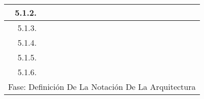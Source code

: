 \documentclass[12pt]{article}
\begin{document}
\begin{table}[H]
{\begin{tabular}{|rllllllllllllllll|}
        \multicolumn{1}{|r|}{5.1.2.} & \multicolumn{1}{c|}{\cellcolor[HTML]{B6D7A8}} & \multicolumn{1}{c|}{\cellcolor[HTML]{B6D7A8}} & \multicolumn{1}{l|}{} & \multicolumn{1}{l|}{} & \multicolumn{1}{l|}{} & \multicolumn{1}{l|}{} & \multicolumn{1}{l|}{} & \multicolumn{1}{l|}{} & \multicolumn{1}{l|}{} & \multicolumn{1}{l|}{} & \multicolumn{1}{l|}{} & \multicolumn{1}{l|}{} & \multicolumn{1}{l|}{} & \multicolumn{1}{l|}{} & \multicolumn{1}{l|}{} &  \\ \hline
        \multicolumn{1}{|r|}{5.1.3.} & \multicolumn{1}{l|}{} & \multicolumn{1}{c|}{\cellcolor[HTML]{B6D7A8}} & \multicolumn{1}{c|}{\cellcolor[HTML]{B6D7A8}} & \multicolumn{1}{c|}{\cellcolor[HTML]{B6D7A8}} & \multicolumn{1}{l|}{} & \multicolumn{1}{l|}{} & \multicolumn{1}{l|}{} & \multicolumn{1}{l|}{} & \multicolumn{1}{l|}{} & \multicolumn{1}{l|}{} & \multicolumn{1}{l|}{} & \multicolumn{1}{l|}{} & \multicolumn{1}{l|}{} & \multicolumn{1}{l|}{} & \multicolumn{1}{l|}{} &  \\ \hline
        \multicolumn{1}{|r|}{5.1.4.} & \multicolumn{1}{l|}{} & \multicolumn{1}{l|}{} & \multicolumn{1}{c|}{\cellcolor[HTML]{B6D7A8}} & \multicolumn{1}{l|}{} & \multicolumn{1}{l|}{} & \multicolumn{1}{l|}{} & \multicolumn{1}{l|}{} & \multicolumn{1}{l|}{} & \multicolumn{1}{l|}{} & \multicolumn{1}{l|}{} & \multicolumn{1}{l|}{} & \multicolumn{1}{l|}{} & \multicolumn{1}{l|}{} & \multicolumn{1}{l|}{} & \multicolumn{1}{l|}{} &  \\ \hline
        \multicolumn{1}{|r|}{5.1.5.} & \multicolumn{1}{l|}{} & \multicolumn{1}{l|}{} & \multicolumn{1}{c|}{\cellcolor[HTML]{B6D7A8}} & \multicolumn{1}{c|}{\cellcolor[HTML]{B6D7A8}} & \multicolumn{1}{l|}{} & \multicolumn{1}{l|}{} & \multicolumn{1}{l|}{} & \multicolumn{1}{l|}{} & \multicolumn{1}{l|}{} & \multicolumn{1}{l|}{} & \multicolumn{1}{l|}{} & \multicolumn{1}{l|}{} & \multicolumn{1}{l|}{} & \multicolumn{1}{l|}{} & \multicolumn{1}{l|}{} &  \\ \hline
        \multicolumn{1}{|r|}{5.1.6.} & \multicolumn{1}{l|}{} & \multicolumn{1}{l|}{} & \multicolumn{1}{l|}{} & \multicolumn{1}{c|}{\cellcolor[HTML]{B6D7A8}} & \multicolumn{1}{l|}{} & \multicolumn{1}{l|}{} & \multicolumn{1}{l|}{} & \multicolumn{1}{l|}{} & \multicolumn{1}{l|}{} & \multicolumn{1}{l|}{} & \multicolumn{1}{l|}{} & \multicolumn{1}{l|}{} & \multicolumn{1}{l|}{} & \multicolumn{1}{l|}{} & \multicolumn{1}{l|}{} &  \\ \hline
        \multicolumn{17}{|c|}{\cellcolor[HTML]{D9D9D9}Fase: Definición De La Notación De La Arquitectura} \\ \hline

\end{tabular}}
\end{table}
\end{document}
